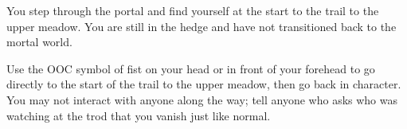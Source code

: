 \documentclass[green]{gl2018}
\begin{document}
\begin{sect}{12}
You step through the portal and find yourself at the start to the trail to the upper meadow. You are still in the hedge and have not transitioned back to the mortal world.

Use the OOC symbol of fist on your head or in front of your forehead to go directly to the start of the trail to the upper meadow, then go back in character. You may not interact with anyone along the way; tell anyone who asks who was watching at the trod that you vanish just like normal.

\end{sect}
\end{document}
